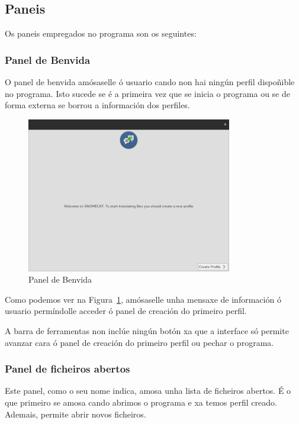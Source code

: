 \subsection{Paneis}
Os paneis empregados no programa son os seguintes:

\subsubsection{Panel de Benvida}

O panel de benvida amósaselle ó usuario cando non hai ningún perfil dispoñible no programa. Isto sucede se é a primeira vez que se inicia o programa ou se de forma externa se borrou a información dos perfiles.

\begin{figure}[h!]
    \centering
    \includegraphics[width=0.8\textwidth]{img/panel_benvida.png}
    \caption{Panel de Benvida}
    \label{fig:ui:panel:welcome}
\end{figure}

Como podemos ver na Figura~\ref{fig:ui:panel:welcome}, amósaselle unha mensaxe de información ó usuario permíndolle acceder ó panel de creación do primeiro perfil.

A barra de ferramentas non inclúe ningún botón xa que a interface só permite avanzar cara ó panel de creación do primeiro perfil ou pechar o programa.

\subsubsection{Panel de ficheiros abertos}

Este panel, como o seu nome indica, amosa unha lista de ficheiros abertos. É o que primeiro se amosa cando abrimos o programa e xa temos perfil creado. Ademais, permite abrir novos ficheiros.

